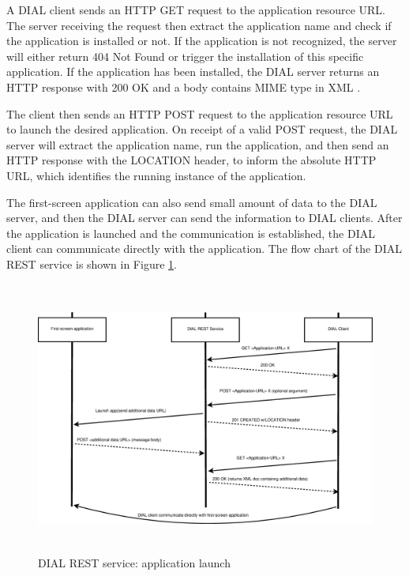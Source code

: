 A DIAL client sends an HTTP GET request to the application resource URL. 
The server receiving the request then extract the application name and check if the 
application is installed or not. If the application is not recognized, the 
server will either return 404 Not Found or trigger the installation of this specific 
application. If the application has been installed, the DIAL server returns 
an HTTP response with 200 OK and a body contains MIME type in XML \cite{dial}.

The client then sends an HTTP POST request to the application resource URL to 
launch the desired application. On receipt of a valid POST request, the DIAL 
server will extract the application name, run the application, and then send 
an HTTP response with the LOCATION header, to inform the absolute HTTP URL, which 
identifies the running instance of the application.

The first-screen application can also send small amount of data to the DIAL 
server, and then the DIAL server can send the information to DIAL clients. 
After the application is launched and the communication is established, the DIAL 
client can communicate directly with the application. The flow chart of  the
DIAL REST service is  shown in Figure \ref{dial_rest}.
\begin{figure}[htb] \centering \includegraphics[height=9cm]{charts/dial_rest} 
\caption{DIAL REST service: application launch \label{dial_rest}} 
\end{figure} 
\clearpage
